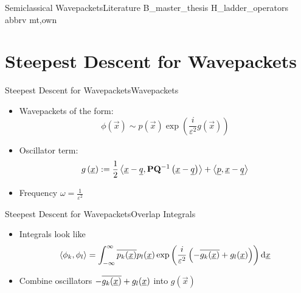 \documentclass{beamer}
\begin{document}
\begin{frame}{Semiclassical Wavepackets}{Literature}
  \nocite{hawp}{B_master_thesis}
  \nocite{hawp}{H_ladder_operators}
  \scriptsize
  {abbrv}
  {mt,own}{}
\end{frame}


\section{Steepest Descent for Wavepackets}


\begin{frame}{Steepest Descent for Wavepackets}{Wavepackets}
  \begin{itemize}
    \item Wavepackets of the form:
    \begin{equation*}
      \phi(\vec{x}) \sim p\left(\vec{x}\right)\exp\left(\frac{i}{\varepsilon^2} g\left(\vec{x}\right)\right)
    \end{equation*}
    \item Oscillator term:
    \begin{equation*}
      g\left(\underline{x}\right)
      :=
      \frac{1}{2} \left\langle \underline{x}-\underline{q} , \mathbf{P}\mathbf{Q}{}^{-1} \left(\underline{x}-\underline{q}\right) \right\rangle
      +
      \left\langle \underline{p} , \underline{x}-\underline{q} \right\rangle
    \end{equation*}
    \item Frequency $\omega = \frac{1}{\varepsilon^2}$
  \end{itemize}
\end{frame}


\begin{frame}{Steepest Descent for Wavepackets}{Overlap Integrals}
  \begin{itemize}
    \item Integrals look like
    \begin{equation*}
      \left\langle \phi_k , \phi_l \right\rangle =
      \int_{-\infty}^{\infty}
        \overline{p_k(\underline{x})} p_l(\underline{x})
        \exp\left(\frac{i}{\varepsilon^2}\left(-\overline{g_k(\underline{x})} + g_l(\underline{x})\right)\right)
      \mathrm{d}\underline{x}
    \end{equation*}
    \item Combine oscillators $-\overline{g_k(\underline{x})} + g_l(\underline{x})$ into $g(\vec{x})$
  \end{itemize}
\end{frame}
\end{document}
